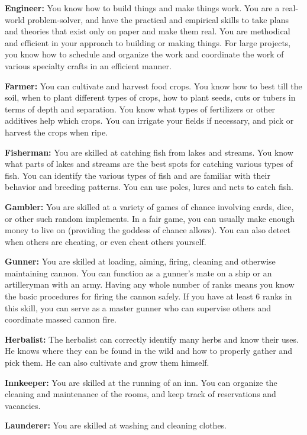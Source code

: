 \begin{itemize*}
	\item \textbf{Engineer:} You know how to build things and make things work. You are a real-world problem-solver, and have the practical and empirical skills to take plans and theories that exist only on paper and make them real. You are methodical and efficient in your approach to building or making things. For large projects, you know how to schedule and organize the work and coordinate the work of various specialty crafts in an efficient manner.
	\item \textbf{Farmer:} You can cultivate and harvest food crops. You know how to best till the soil, when to plant different types of crops, how to plant seeds, cuts or tubers in terms of depth and separation. You know what types of fertilizers or other additives help which crops. You can irrigate your fields if necessary, and pick or harvest the crops when ripe.
	\item \textbf{Fisherman:} You are skilled at catching fish from lakes and streams. You know what parts of lakes and streams are the best spots for catching various types of fish. You can identify the various types of fish and are familiar with their behavior and breeding patterns. You can use poles, lures and nets to catch fish.
	\item \textbf{Gambler:} You are skilled at a variety of games of chance involving cards, dice, or other such random implements. In a fair game, you can usually make enough money to live on (providing the goddess of chance allows). You can also detect when others are cheating, or even cheat others yourself.
	\item \textbf{Gunner:} You are skilled at loading, aiming, firing, cleaning and otherwise maintaining cannon. You can function as a gunner's mate on a ship or an artilleryman with an army. Having any whole number of ranks means you know the basic procedures for firing the cannon safely. If you have at least 6 ranks in this skill, you can serve as a master gunner who can supervise others and coordinate massed cannon fire.
	\item \textbf{Herbalist:} The herbalist can correctly identify many herbs and know their uses. He knows where they can be found in the wild and how to properly gather and pick them. He can also cultivate and grow them himself.
	\item \textbf{Innkeeper:} You are skilled at the running of an inn. You can organize the cleaning and maintenance of the rooms, and keep track of reservations and vacancies.
	\item \textbf{Launderer:} You are skilled at washing and cleaning clothes.

\end{itemize*}
